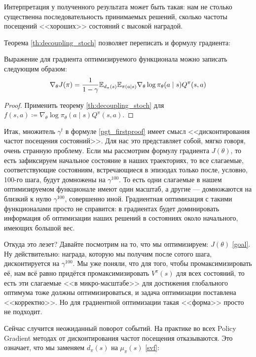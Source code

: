 Интерпретация у полученного результата может быть такая: нам не столько существенна последовательность принимаемых решений, сколько частоты посещений <<хороших>> состояний с высокой наградой. 

Теорема \ref{th:decoupling_stoch} позволяет переписать и формулу градиента:

\begin{proposition} Выражение для градиента оптимизируемого функционала можно записать следующим образом:
\begin{equation}\label{gradient}
\nabla_{\theta} J(\pi) = \frac{1}{1 - \gamma}\mathbb{E}_{d_\pi(s)} \mathbb{E}_{\pi(a \mid s)} \nabla_{\theta} \log \pi_\theta (a \mid s) Q^{\pi}(s, a)
\end{equation}
\begin{proof}
Применить теорему \ref{th:decoupling_stoch} для $f(s, a) \coloneqq \nabla_{\theta} \log \pi_\theta (a \mid s) Q^{\pi}(s, a)$.
\end{proof}
\end{proposition}

Итак, множитель $\gamma^t$ в формуле \eqref{pgt_firstproof} имеет смысл <<дисконтирования частот посещения состояний>>. Для нас это представляет собой, мягко говоря, очень странную проблему. Если мы рассмотрим формулу градиента $J(\theta)$, то есть зафиксируем начальное состояние в наших траекториях, то все слагаемые, соответствующие состояниям, встречающиеся в эпизодах только после, условно, 100-го шага, будут домножены на $\gamma^{100}$. То есть одни слагаемые в нашем оптимизируемом функционале имеют один масштаб, а другие --- домножаются на близкий к нулю $\gamma^{100}$, совершенно иной. Градиентная оптимизация с такими функционалами просто не справится: в градиентах будет доминировать информация об оптимизации наших решений в состояниях около начального, имеющих большой вес.

Откуда это лезет? Давайте посмотрим на то, что мы оптимизируем: $J(\theta)$ \eqref{goal}. Ну действительно: награда, которую мы получим после сотого шага, дисконтируется на $\gamma^{100}$. Мы уже поняли, что для того, чтобы промаксимизировать её, нам всё равно придётся промаксимизировать $V^{\pi}(s)$ для всех состояний, то есть эти слагаемые <<в микро-масштабе>> для достижения глобального оптимума тоже должны оптимизироваться, и задача оптимизации поставлена <<корректно>>. Но для градиентной оптимизации такая <<форма>> просто не подходит.

Сейчас случится неожиданный поворот событий. На практике во всех Policy Gradient методах от дисконтирования частот посещения отказываются. Это означает, что мы заменяем $d_{\pi}(s)$ на $\mu_{\pi}(s)$ \eqref{svf}:

